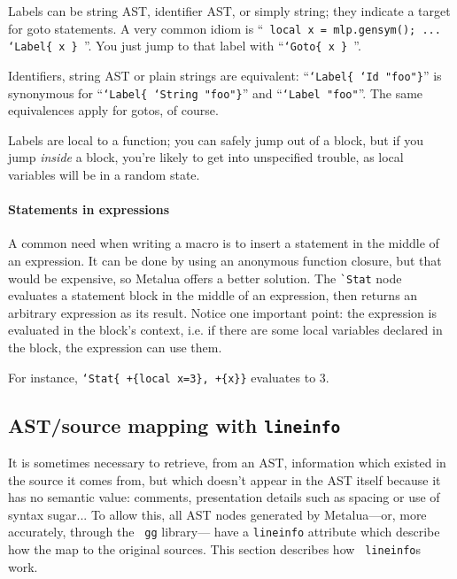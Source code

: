 Labels can be string AST, identifier AST, or simply string; they
indicate a target for goto statements.  A very common idiom is ``{\tt
  local x = mlp.gensym(); ... `Label\{ x \} }''. You just jump to that
label with ``{\tt `Goto\{ x \} }''.

Identifiers, string AST or plain strings are equivalent: 
``{\tt`Label\{ `Id "foo"\}}'' is synonymous for ``{\tt`Label\{ `String
  "foo"\}}'' and ``{\tt`Label "foo"}''. The same equivalences apply
for gotos, of course.

Labels are local to a function; you can safely jump out of a block,
but if you jump {\em inside} a block, you're likely to get into unspecified
trouble, as local variables will be in a random state.

\paragraph{Statements in expressions}
A common need when writing a macro is to insert a statement in the
middle of an expression. It can be done by using an anonymous function
closure, but that would be expensive, so Metalua offers a better
solution. The \verb|`Stat| node evaluates a statement block in the
middle of an expression, then returns an arbitrary expression as its
result. Notice one important point: the expression is evaluated in
the block's context, i.e. if there are some local variables declared
in the block, the expression can use them.

For instance, {\tt `Stat\{ +\{local x=3\}, +\{x\}\}} evaluates to 3.



\subsection{AST/source mapping with {\tt lineinfo}}

It is sometimes necessary to retrieve, from an AST, information which
existed in the source it comes from, but which doesn't appear in the
AST itself because it has no semantic value: comments, presentation
details such as spacing or use of syntax sugar... To allow this, all
AST nodes generated by Metalua---or, more accurately, through the {\tt
gg} library--- have a {\tt lineinfo} attribute which describe how the
map to the original sources. This section describes how {\tt
  lineinfo}s work.

